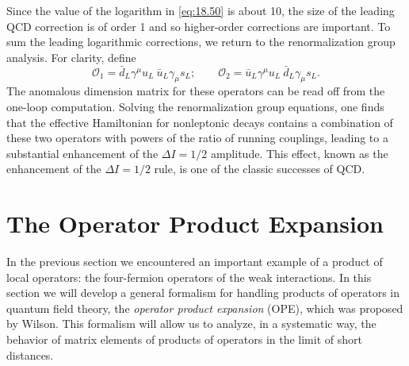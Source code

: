 Since the value of the logarithm in \eqref{eq:18.50} is about 10, the size
of the leading QCD correction is of order 1 and so higher-order corrections
are important.  To sum the leading logarithmic corrections, we return to the
renormalization group analysis.  For clarity, define
\begin{equation}
  \mathcal{O}_1 = \bar{d}_L\gamma^\mu u_L\ \bar{u}_L\gamma_\mu s_L;
  \qquad \mathcal{O}_2 = \bar{u}_L\gamma^\mu u_L\ \bar{d}_L\gamma_\mu s_L .
  \label{eq:18.52}
\end{equation}
The anomalous dimension matrix for these operators can be read off from the
one-loop computation.  Solving the renormalization group equations, one finds
that the effective Hamiltonian for nonleptonic decays contains a
combination of these two operators with powers of the ratio of running
couplings, leading to a substantial enhancement of the $\Delta I = 1/2$
amplitude.  This effect, known as the enhancement of the $\Delta I = 1/2$
rule, is one of the classic successes of QCD.

\section{The Operator Product Expansion}

In the previous section we encountered an important example of a product of
local operators: the four-fermion operators of the weak interactions.  In this
section we will develop a general formalism for handling products of
operators in quantum field theory, the \emph{operator product expansion}
(OPE), which was proposed by Wilson.  This formalism will allow us to
analyze, in a systematic way, the behavior of matrix elements of products of
operators in the limit of short distances.

